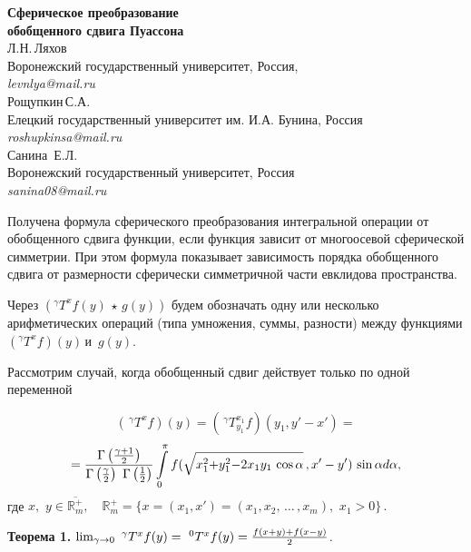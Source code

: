 \begin{center}
{\bf Сферическое преобразование \\ обобщенного сдвига  Пуассона }\\
Л.Н.\,Ляхов \\
Воронежский государственный университет, Россия, \\
{\it levnlya@mail.ru} \\
Рощупкин\,С.А. \\
Елецкий государственный университет им. И.А. Бунина, Россия \\
 {\it roshupkinsa@mail.ru}\\
 Санина \,Е.Л. \\
Воронежский государственный университет, Россия \\
{\it sanina08@mail.ru}
\end{center}

Получена формула сферического преобразования интегральной операции от обобщенного сдвига функции, если функция зависит от многоосевой сферической симметрии. При этом формула показывает зависимость порядка обобщенного сдвига от размерности сферически симметричной части евклидова пространства.%

	Через
	$
	\left(^\gamma T^xf(y)\,\star\,g(y)\right)
	$
	будем обозначать одну или несколько арифметических операций (типа умножения, суммы, разности) между функциями $\left(^\gamma T^xf\right)(y)$\,и \,$g(y)$.

	 Рассмотрим случай, когда обобщенный сдвиг действует только по одной переменной

$$
(\,^\gamma T^{x}f)(y){=}(\,^\gamma T_{y_1}^{x_1}f)(y_1,y'{-}x')=$$
$$
=\frac{\Gamma\left(\gamma+1\over2\right)}{\Gamma\left(\frac{\gamma}{2}\right)\,\,\Gamma\left(\frac{1}{2}\right)}\int\limits_0^\pi
f(\sqrt{x_1^2{+}y^2_1{-}2x_1y_1\,\cos\alpha}\,,x'-y')\,\sin\alpha
d\alpha,
$$
где $x,\,\,y\in\overline{\mathbb{R}^+_m},\quad	\mathbb{R}^+_m{=}\{x{=}(x_1,x'){=}(x_1,x_2,\,\ldots\,,x_m),\,\,x_1>0\}\,.$

	{\bf Теорема 1.}  {\it $\lim_{\gamma\to0}\,\,^\gamma T^x f(y)=\,\,^0T^x f(y)={f(x+y)+f(x-y)\over2}$.}

